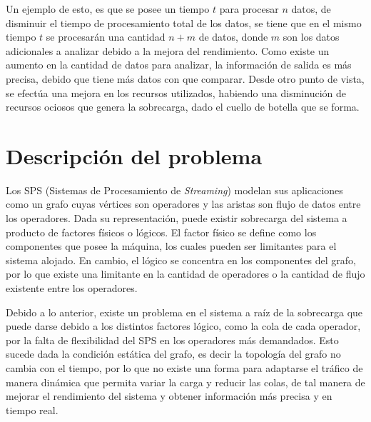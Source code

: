 Un ejemplo de esto, es que se posee un tiempo $t$ para procesar $n$ datos, de disminuir el tiempo de procesamiento total de los datos, se tiene que en el mismo tiempo $t$ se procesarán una cantidad $n+m$ de datos, donde $m$ son los datos adicionales a analizar debido a la mejora del rendimiento. Como existe un aumento en la cantidad de datos para analizar, la información de salida es más precisa, debido que tiene más datos con que comparar. Desde otro punto de vista, se efectúa una mejora en los recursos utilizados, habiendo una disminución de recursos ociosos que genera la sobrecarga, dado el cuello de botella que se forma.

\section{Descripción del problema}
\label{intro:problema}


Los SPS (Sistemas de Procesamiento de \textit{Streaming}) modelan sus aplicaciones como un grafo cuyas vértices son operadores y las aristas son flujo de datos entre los operadores. Dada su representación, puede existir sobrecarga del sistema a producto de factores físicos o lógicos. El factor físico se define como los componentes que posee la máquina, los cuales pueden ser limitantes para el sistema alojado. En cambio, el lógico se concentra en los componentes del grafo, por lo que existe una limitante en la cantidad de operadores o la cantidad de flujo existente entre los operadores.


Debido a lo anterior, existe un problema en el sistema a raíz de la sobrecarga que puede darse debido a los distintos factores lógico, como la cola de cada operador, por la falta de flexibilidad del SPS en los operadores más demandados. Esto sucede dada la condición estática del grafo, es decir la topología del grafo no cambia con el tiempo, por lo que no existe una forma para adaptarse el tráfico de manera dinámica que permita variar la carga y reducir las colas, de tal manera de mejorar el rendimiento del sistema y obtener información más precisa y en tiempo real.

